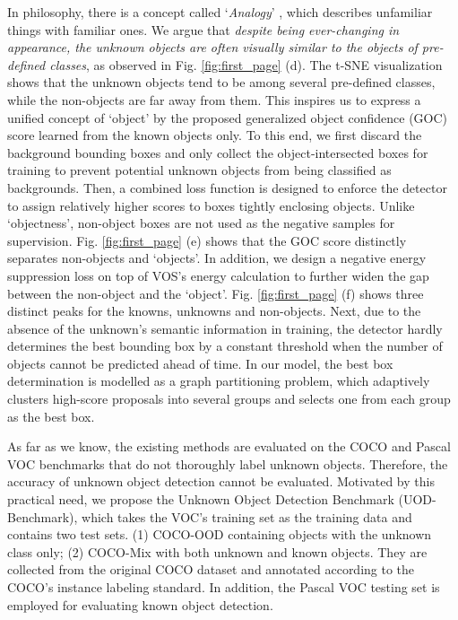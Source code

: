 \documentclass[10pt,twocolumn,letterpaper]{article}
\newcommand{\xf}[1]{{\color{black} #1}}
\begin{document}
In philosophy,
there is a concept called `\emph{Analogy}' \cite{Ribeiro2014},
which describes unfamiliar things with familiar ones.
We argue that \textit{despite being ever-changing in appearance,
the unknown objects are often visually similar to the objects \xf{of} pre-defined classes},
as observed in Fig. \ref{fig:first_page} (d).
The t-SNE visualization shows that the unknown objects tend to be \xf{among} several pre-defined classes,
while the non-objects are far away from them.
\xf{This inspires} us to express a unified concept of `object' by the proposed generalized object confidence (GOC) score learned from the known objects only.
To this end,
we first discard the background bounding boxes and only collect the object-intersected boxes for training to prevent potential unknown objects from being \xf{classified} as backgrounds.
Then, a combined loss function is designed to enforce the detector to assign relatively higher scores to boxes tightly enclosing objects.
\xf{Unlike} `objectness',
non-object boxes are not used as the negative samples for supervision.
Fig. \ref{fig:first_page} (e) shows that the GOC score distinctly separates \xf{non-objects} and \xf{`objects'}.
In addition,
we design a negative energy suppression loss on top of VOS's energy calculation \cite{vos} to further widen the gap between the non-object and the `object'.
Fig. \ref{fig:first_page} (f) shows three distinct peaks for the \xf{knowns, unknowns and non-objects.}
Next,
due to the absence of the unknown's semantic information in training,
the detector hardly determines the best bounding box by a constant threshold when the number of objects cannot be \xf{predicted} ahead of time.
In our model,
the best box determination is modelled as a graph partitioning problem,
which adaptively clusters high-score proposals into several groups and selects one from each group as the best box.



As far as we know,
the existing methods are evaluated on the COCO \cite{lin2014microsoft} and Pascal VOC benchmarks \cite{voc} that do not thoroughly label unknown objects.
Therefore, the \xf{accuracy} of unknown object detection cannot be evaluated.
Motivated by this practical need,
we propose the Unknown Object Detection Benchmark (UOD-Benchmark),
which takes the VOC's training set as the training data and contains two test sets.
(1) COCO-OOD containing objects with the unknown class only;
(2) COCO-Mix with both unknown and known objects.
They are collected from the original COCO dataset \cite{lin2014microsoft} and annotated \xf{according to} the COCO's instance labeling standard.
In addition,
the Pascal VOC testing set is employed for evaluating known object detection.
\end{document}
